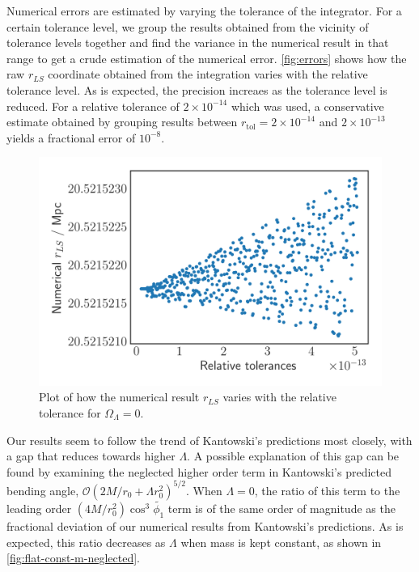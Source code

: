 Numerical errors are estimated by varying the tolerance of the integrator. For a certain tolerance level, we group the results obtained from the vicinity of tolerance levels together and find the variance in the numerical result in that range to get a crude estimation of the numerical error. \autoref{fig:errors} shows how the raw $r_{LS}$ coordinate obtained from the integration varies with the relative tolerance level. As is expected, the precision increaes as the tolerance level is reduced. For a relative tolerance of $2 \times 10^{-14}$ which was used, a conservative estimate obtained by grouping results between $r_{\text{tol}} = 2 \times 10^{-14}$ and $2 \times 10^{-13}$ yields a fractional error of $10^{-8}$. 

\begin{figure}
  \centering
  \includegraphics[height=0.5\linewidth]{images/errors.png}
  \caption{Plot of how the numerical result $r_{LS}$ varies with the relative tolerance for $\Omega_{\Lambda} = 0$. }
  \label{fig:errors}
\end{figure}

Our results seem to follow the trend of Kantowski's predictions most closely, with a gap that reduces towards higher $\Lambda$. A possible explanation of this gap can be found by examining the neglected higher order term in Kantowski's predicted bending angle, $\mathcal{O}\left ( 2M/r_0 + \Lambda r_0^2 \right )^{5/2}$. When $\Lambda = 0$, the ratio of this term to the leading order $(4M/r_0^2) \cos^3 \tilde{\phi_1}$ term is of the same order of magnitude as the fractional deviation of our numerical results from Kantowski's predictions. As is expected, this ratio decreases as $\Lambda$ when mass is kept constant, as shown in \autoref{fig:flat-const-m-neglected}. 

